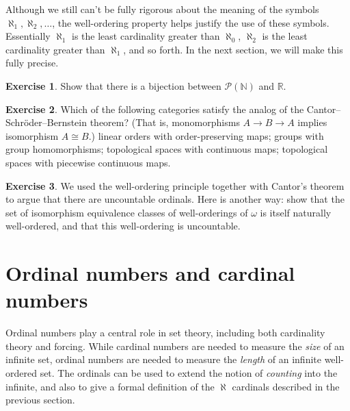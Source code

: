 \documentclass[11pt,oneside]{amsart}
\newcommand{\NN}{\mathbb N}
\newcommand{\RR}{\mathbb R}
\theoremstyle{definition}
\newtheorem{exerc}{Exercise}[section]
\theoremstyle{definition}
\theoremstyle{remark}
\begin{document}
Although we still can't be fully rigorous about the meaning of the symbols $\aleph_1,\aleph_2,\ldots$, the well-ordering property helps justify the use of these symbols. Essentially $\aleph_1$ is the least cardinality greater than $\aleph_0$, $\aleph_2$ is the least cardinality greater than $\aleph_1$, and so forth. In the next section, we will make this fully precise.

\begin{exerc}
  Show that there is a bijection between $\mathcal P(\NN)$ and $\RR$.
\end{exerc}

\begin{exerc}
  Which of the following categories satisfy the analog of the Cantor--Schr\"oder--Bernstein theorem? (That is, monomorphisms $A\to B\to A$ implies isomorphism $A\cong B$.) linear orders with order-preserving maps; groups with group homomorphisms; topological spaces with continuous maps; topological spaces with piecewise continuous maps.
\end{exerc}

\begin{exerc}
  We used the well-ordering principle together with Cantor's theorem to argue that there are uncountable ordinals. Here is another way: show that the set of isomorphism equivalence classes of well-orderings of $\omega$ is itself naturally well-ordered, and that this well-ordering is uncountable.
\end{exerc}


\section{Ordinal numbers and cardinal numbers}

Ordinal numbers play a central role in set theory, including both cardinality theory and forcing. While cardinal numbers are needed to measure the \emph{size} of an infinite set, ordinal numbers are needed to measure the \emph{length} of an infinite well-ordered set. The ordinals can be used to extend the notion of \emph{counting} into the infinite, and also to give a formal definition of the $\aleph$ cardinals described in the previous section.
\end{document}

